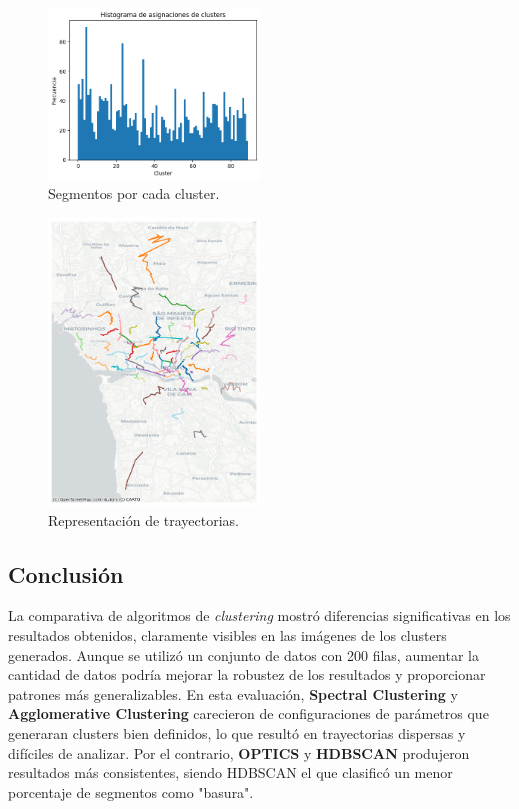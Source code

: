 \begin{enumerate}
\begin{figure}[h!]
    \centering
    \includegraphics[width=0.5\textwidth]{img/histograma_Spect.png}
    \caption{Segmentos por cada cluster.}
    \label{fig:histograma_Spectral}
\end{figure}

\begin{figure}[h!]
    \centering
    \includegraphics[width=0.5\textwidth]{img/r_tray_Spect.png}
    \caption{Representación de trayectorias.}
    \label{fig:trayectorias_Spectral}
\end{figure}

\FloatBarrier

\end{enumerate}

\subsection{Conclusión}

La comparativa de algoritmos de \textit{clustering} mostró diferencias significativas en los resultados obtenidos, claramente visibles en las imágenes de los clusters generados. Aunque se utilizó un conjunto de datos con 200 filas, aumentar la cantidad de datos podría mejorar la robustez de los resultados y proporcionar patrones más generalizables. En esta evaluación, \textbf{Spectral Clustering} y \textbf{Agglomerative Clustering} carecieron de configuraciones de parámetros que generaran clusters bien definidos, lo que resultó en trayectorias dispersas y difíciles de analizar. Por el contrario, \textbf{OPTICS} y \textbf{HDBSCAN} produjeron resultados más consistentes, siendo HDBSCAN el que clasificó un menor porcentaje de segmentos como "basura".

